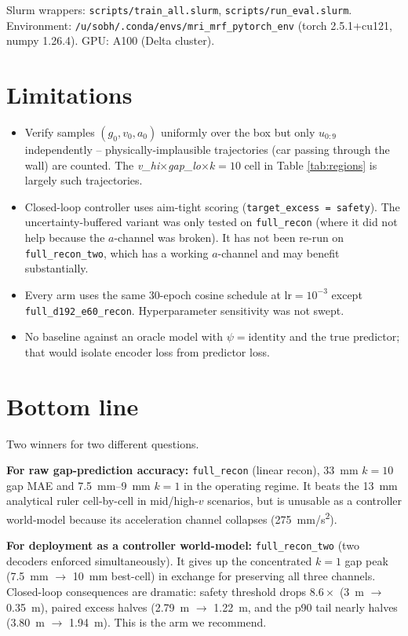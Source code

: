 \documentclass[11pt,a4paper]{article}
\begin{document}
Slurm wrappers: \texttt{scripts/train\_all.slurm},
\texttt{scripts/run\_eval.slurm}. Environment:
\texttt{/u/sobh/.conda/envs/mri\_mrf\_pytorch\_env}
(torch 2.5.1+cu121, numpy 1.26.4). GPU: A100 (Delta cluster).

\section{Limitations}

\begin{itemize}
\item Verify samples $(g_0, v_0, a_0)$ uniformly over the box but only
      $u_{0:9}$ independently -- physically-implausible trajectories
      (car passing through the wall) are counted. The
      \emph{v\_hi}$\times$\emph{gap\_lo}$\times k{=}10$ cell in
      Table \ref{tab:regions} is largely such trajectories.
\item Closed-loop controller uses aim-tight scoring
      (\texttt{target\_excess = safety}). The uncertainty-buffered variant
      was only tested on \texttt{full\_recon} (where it did not help because
      the $a$-channel was broken). It has not been re-run on
      \texttt{full\_recon\_two}, which has a working $a$-channel and may
      benefit substantially.
\item Every arm uses the same 30-epoch cosine schedule at $\text{lr}{=}10^{-3}$
      except \texttt{full\_d192\_e60\_recon}. Hyperparameter sensitivity was
      not swept.
\item No baseline against an oracle model with $\psi = \text{identity}$ and
      the true predictor; that would isolate encoder loss from predictor loss.
\end{itemize}

\section{Bottom line}

Two winners for two different questions.

\textbf{For raw gap-prediction accuracy:} \texttt{full\_recon} (linear
recon), \SI{33}{\mm} $k{=}10$ gap MAE and \SIrange{7.5}{9}{\mm} $k{=}1$ in
the operating regime. It beats the \SI{13}{\mm} analytical ruler cell-by-cell
in mid/high-$v$ scenarios, but is unusable as a controller world-model
because its acceleration channel collapses (\SI{275}{\mm/\s^2}).

\textbf{For deployment as a controller world-model:}
\texttt{full\_recon\_two} (two decoders enforced simultaneously). It gives
up the concentrated $k{=}1$ gap peak (\SI{7.5}{\mm} $\to$ \SI{10}{\mm}
best-cell) in exchange for preserving all three channels. Closed-loop
consequences are dramatic: safety threshold drops $8.6\times$ (\SI{3}{\m}
$\to$ \SI{0.35}{\m}), paired excess halves (\SI{2.79}{\m} $\to$
\SI{1.22}{\m}, and the p90 tail nearly halves (\SI{3.80}{\m} $\to$
\SI{1.94}{\m}). This is the arm we recommend.
\end{document}

